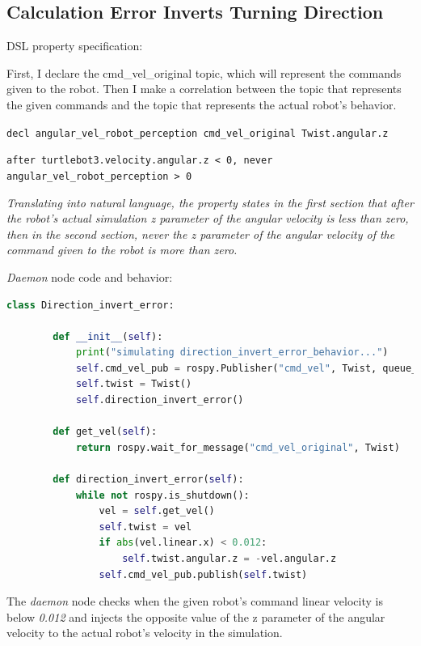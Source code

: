 \subsection{Calculation Error Inverts Turning Direction}
\label{ssec:calculationerrorinvertsturningdirection}

DSL property specification:

First, I declare the cmd\_vel\_original topic, which will represent the commands given to the robot.
Then I make a correlation between the topic that represents the given commands and the topic that represents the actual robot's behavior.

\texttt{decl angular\_vel\_robot\_perception cmd\_vel\_original Twist.angular.z}

\texttt{after turtlebot3.velocity.angular.z < 0, never angular\_vel\_robot\_perception > 0}

\textit{Translating into natural language, the property states in the first section that after the robot's actual simulation z parameter of the angular velocity is less than zero, then in the second section, never the z parameter of the angular velocity of the command given to the robot is more than zero.}

\textit{Daemon} node code and behavior:

\begin{lstlisting}[language=Python]
    class Direction_invert_error:

        def __init__(self):
            print("simulating direction_invert_error_behavior...")
            self.cmd_vel_pub = rospy.Publisher("cmd_vel", Twist, queue_size=1)
            self.twist = Twist()
            self.direction_invert_error()

        def get_vel(self):
            return rospy.wait_for_message("cmd_vel_original", Twist)

        def direction_invert_error(self):
            while not rospy.is_shutdown():
                vel = self.get_vel()
                self.twist = vel
                if abs(vel.linear.x) < 0.012:
                    self.twist.angular.z = -vel.angular.z
                self.cmd_vel_pub.publish(self.twist)
\end{lstlisting}

The \textit{daemon} node checks when the given robot's command linear velocity is below \textit{0.012} and injects the opposite value of the z parameter of the angular velocity to the actual robot's velocity in the simulation.

